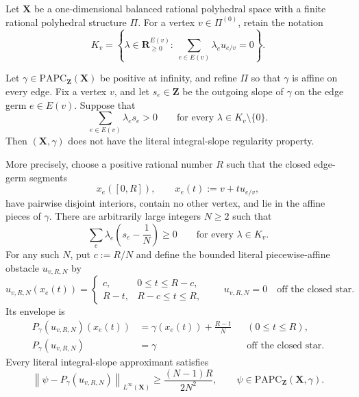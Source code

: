 
Let $\mathbf X$ be a one-dimensional balanced rational polyhedral space
with a finite rational polyhedral structure $\Pi$.  For a vertex
$v\in\Pi^{(0)}$, retain the notation
\[
 K_v=\left\{\lambda\in\mathbf R_{\geq0}^{E(v)}:\
             \sum_{e\in E(v)}\lambda_eu_{e/v}=0\right\}.
\]

\begin{theorem}
\label{thm:frontier-polyhedral-strict-vertex-integral-nonregularity}
Let $\gamma\in\mathrm{PAPC}_{\mathbf Z}(\mathbf X)$ be positive at
infinity, and refine $\Pi$ so that $\gamma$ is affine on every edge.  Fix a
vertex $v$, and let $s_e\in\mathbf Z$ be the outgoing slope of $\gamma$ on
the edge germ $e\in E(v)$.  Suppose that
\begin{equation}
             \sum_{e\in E(v)}\lambda_es_e>0
             \qquad\text{for every }\lambda\in K_v\setminus\{0\}.
 \label{eq:frontier-polyhedral-strict-vertex}
\end{equation}
Then $(\mathbf X,\gamma)$ does not have the literal integral-slope
regularity property.

More precisely, choose a positive rational number $R$ such that the closed
edge-germ segments
\[
       x_e([0,R]),\qquad x_e(t):=v+tu_{e/v},
\]
have pairwise disjoint interiors, contain no other vertex, and lie in the
affine pieces of $\gamma$.  There are arbitrarily large integers $N\geq2$
such that
\begin{equation}
 \sum_e\lambda_e\left(s_e-\frac1N\right)\geq0
                 \qquad\text{for every }\lambda\in K_v.
 \label{eq:frontier-polyhedral-strict-vertex-choice}
\end{equation}
For any such $N$, put $c:=R/N$ and define the bounded literal
piecewise-affine obstacle $u_{v,R,N}$ by
\[
 u_{v,R,N}(x_e(t))=
 \begin{cases}
  c,&0\leq t\leq R-c,\\
  R-t,&R-c\leq t\leq R,
 \end{cases}
 \qquad
 u_{v,R,N}=0\quad\text{off the closed star}.
\]
Its envelope is
\begin{equation}
 \begin{aligned}
 P_\gamma(u_{v,R,N})(x_e(t))
   &=\gamma(x_e(t))+\frac{R-t}{N}
       &&(0\leq t\leq R),\\
 P_\gamma(u_{v,R,N})&=\gamma
       &&\text{off the closed star}.
 \end{aligned}
 \label{eq:frontier-polyhedral-strict-vertex-envelope}
\end{equation}
Every literal integral-slope approximant satisfies
\begin{equation}
 \left\lVert\psi-P_\gamma(u_{v,R,N})\right\rVert_{L^\infty(\mathbf X)}
 \geq \frac{(N-1)R}{2N^2},
 \qquad
 \psi\in\mathrm{PAPC}_{\mathbf Z}(\mathbf X,\gamma).
 \label{eq:frontier-polyhedral-strict-vertex-separation}
\end{equation}
\end{theorem}

